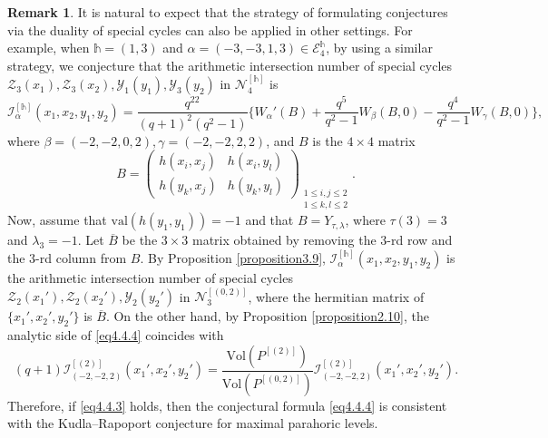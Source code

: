 \documentclass[11pt,oneside]{amsart}
\newcommand{\val}{{\mathrm{val}}}
\theoremstyle{plain}
\theoremstyle{definition}
\newtheorem{remark}[theorem]{Remark}
\theoremstyle{remark}
\newcommand{\tx}[1]{\text{#1}}
\newcommand{\CE}{{\mathcal E}}
\newcommand{\CI}{{\mathcal I}}
\newcommand{\CN}{{\mathcal N}}
\newcommand{\CY}{{\mathcal Y}}
\newcommand{\CZ}{{\mathcal Z}}
\numberwithin{equation}{section}
\begin{document}
	\begin{remark}\label{remark4.7}
		It is natural to expect that the strategy of formulating conjectures via the duality of special cycles can also be applied in other settings. For example, when $\mathds{h}=(1,3)$ and $\alpha=(-3,-3,1,3) \in \CE_{4}^{\mathds{h}}$, by using a similar strategy, we conjecture that the arithmetic intersection number of special cycles $\CZ_3(x_1),\CZ_3(x_2),\CY_1(y_1),\CY_3(y_2)$ in $\CN_4^{[\mathds{h}]}$ is
		\begin{equation}\label{eq4.4.4}
			\CI_{\alpha}^{[\mathds{h}]}(x_1,x_2,y_1,y_2)=\dfrac{q^{22}}{(q+1)^2(q^2-1)}\lbrace W_{\alpha}'(B)+\dfrac{q^5}{q^2-1}W_{\beta}(B,0)-\dfrac{q^4}{q^2-1}W_{\gamma}(B,0)\rbrace,
		\end{equation}
		where $\beta=(-2,-2,0,2), \gamma=(-2,-2,2,2)$, and $B$ is the $4 \times 4$ matrix
		\begin{equation*}
			B=	\left(\begin{array}{cc} 
				h(x_i,x_j) & h(x_i,y_l)\\
				h(y_k,x_j)& h(y_k,y_l)
			\end{array} 
			\right)_{\substack{1\leq i,j \leq 2\\ 1 \leq k,l \leq 2}}.
		\end{equation*}
		Now, assume that $\val(h(y_1,y_1))=-1$ and that $B=Y_{\tau, \lambda}$, where $\tau(3)=3$ and $\lambda_3=-1$. Let $\overline{B}$ be the $3 \times 3$ matrix obtained by removing the $3$-rd row and the $3$-rd column from $B$. By Proposition \ref{proposition3.9}, $\CI_{\alpha}^{[\mathds{h}]}(x_1,x_2,y_1,y_2)$ is the arithmetic intersection number of special cycles $\CZ_2(x_1'),\CZ_2(x_2'),\CY_2(y_2')$ in $\CN_3^{[(0,2)]}$, where the hermitian matrix of $\lbrace x_1',x_2',y_2' \rbrace$ is $\overline{B}$. On the other hand, by Proposition \ref{proposition2.10}, the analytic side of \eqref{eq4.4.4} coincides with
		\begin{equation*}
			(q+1)\CI_{(-2,-2,2)}^{[(2)]}(x_1',x_2',y_2')=\dfrac{\tx{Vol}(P^{[(2)]})}{\tx{Vol}(P^{[(0,2)]})}	\CI_{(-2,-2,2)}^{[(2)]}(x_1',x_2',y_2').
		\end{equation*}
		Therefore, if \eqref{eq4.4.3} holds, then the conjectural formula \eqref{eq4.4.4} is consistent with the Kudla--Rapoport conjecture for maximal parahoric levels.
		
	\end{remark}
	
	
	
	
	
	
	
\end{document}
